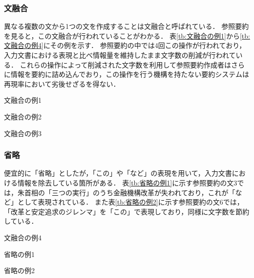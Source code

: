 \subsubsection{文融合}

異なる複数の文から1つの文を作成することは文融合と呼ばれている\cite{barzilay05b}．
参照要約を見ると，この文融合が行われていることがわかる．
表\ref{tb:文融合の例1}から\ref{tb:文融合の例4}にその例を示す．
参照要約の中では4回この操作が行われており，入力文書における表現と比べ情報量を維持したまま文字数の削減が行われている．
これらの操作によって削減された文字数を利用して参照要約作成者はさらに情報を要約に詰め込んでおり，この操作を行う機構を持たない要約システムは再現率において劣後せざるを得ない．

\begin{table}[b]
\caption{文融合の例1}
\label{tb:文融合の例1}

\end{table}
\begin{table}[b]
\caption{文融合の例2}
\label{tb:文融合の例2}

\end{table}
\begin{table}[b]
\caption{文融合の例3}
\label{tb:文融合の例3}

\end{table}


\subsubsection{省略}

便宜的に「省略」としたが，「この」や「など」の表現を用いて，入力文書における情報を除去している箇所がある．
表\ref{tb:省略の例1}に示す参照要約の文3では，朱首相の「三つの実行」のうち金融機構改革が失われており，これが「など」として表現されている．
また表\ref{tb:省略の例2}に示す参照要約の文6では，「改革と安定追求のジレンマ」を「この」で表現しており，同様に文字数を節約している．

\begin{table}[b]
\vspace{-0.3\Cvs}
\caption{文融合の例4}
\label{tb:文融合の例4}

\end{table}
\begin{table}[b]
\vspace{-0.3\Cvs}
\caption{省略の例1}
\label{tb:省略の例1}

\end{table}
\begin{table}[b]
\vspace{-0.3\Cvs}
\caption{省略の例2}
\label{tb:省略の例2}

\end{table}


